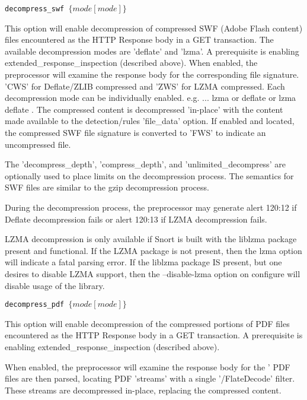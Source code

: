 \documentclass[english]{report}
\newcounter{slistnum}
\newenvironment{slist}
{ \begin{list}{ {\bf \arabic{slistnum}.} }{\usecounter{slistnum} } }
{ \end{list} }
\newenvironment{note}{
\samepage
    \vspace{10pt}{\textsf{
        {\hspace{7pt}\Huge{$\triangle$\hspace{-12.5pt}{\Large{$^!$}}}}\hspace{5pt}
        {\Large{NOTE}}
    }
    }
   \begin{center}
    \par\vspace{-17pt}

    \begin{lrbox}{\savepar}
    \begin{minipage}[r]{6in}
}
{
    \end{minipage}
    \end{lrbox}
    \fbox{
        \usebox{
            \savepar
	}
    }
    \par\vskip10pt
    \end{center}
}
\newenvironment{note}{
        \begin{rawhtml}
        <p><table border="1"><tr><td><b>
        Note:&nbsp;&nbsp;</b>
        \end{rawhtml}
}{
        \begin{rawhtml}
        </b></td></tr></table></p>
        \end{rawhtml}
}
\begin{document}
\begin{slist}
\item \texttt{decompress\_swf $\{ mode [mode] \}$ } 

This option will enable decompression of compressed SWF (Adobe Flash content) files
encountered as the HTTP Response body in a GET transaction.  The available decompression
modes are 'deflate' and 'lzma'.  A prerequisite is enabling
extended\_response\_inspection (described above).  When enabled, the preprocessor will
examine the response body for the corresponding file signature.  'CWS' for Deflate/ZLIB
compressed and 'ZWS' for LZMA compressed.  Each decompression mode can be individually enabled.
e.g. ... { lzma } or { deflate } or { lzma deflate }.  The compressed content is decompressed
'in-place' with the content made available to the detection/rules 'file\_data' option.
If enabled and located, the compressed SWF file signature is converted to 'FWS' to indicate
an uncompressed file.

The 'decompress\_depth', 'compress\_depth', and 'unlimited\_decompress' are optionally used to 
place limits on the decompression process.  The semantics for SWF files are similar to the
gzip decompression process.

During the decompression process, the preprocessor may generate alert 120:12 if Deflate
decompression fails or alert 120:13 if LZMA decompression fails.

\begin{note}
LZMA decompression is only available if Snort is built with the liblzma package present
and functional.  If the LZMA package is not present, then the { lzma } option will indicate
a fatal parsing error.  If the liblzma package IS present, but one desires to disable LZMA
support, then the --disable-lzma option on configure will disable usage of the library.
\end{note}

\item \texttt{decompress\_pdf $\{ mode [mode] \}$ } 

This option will enable decompression of the compressed portions of PDF files encountered
as the HTTP Response body in a GET transaction.  A prerequisite is enabling
extended\_response\_inspection (described above).

When enabled, the preprocessor will examine the response body for the '%
PDF files are then parsed, locating PDF 'streams' with a single '/FlateDecode' filter.  These
streams are decompressed in-place, replacing the compressed content.


\end{slist}
\end{document}
